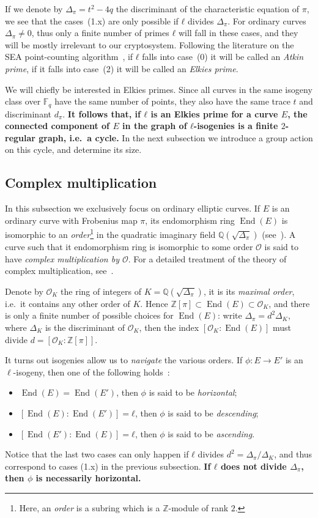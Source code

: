 \documentclass{article}
\newcommand{\F}{\mathbb{F}}
\renewcommand{\O}{\mathcal{O}}
\theoremstyle{definition}
\DeclareMathOperator{\End}{End}
\begin{document}
If we denote by $Δ_π=t^2-4q$ the discriminant of the characteristic
equation of $π$, we see that the cases~(1.x) are only possible if $ℓ$
divides $Δ_π$.  For ordinary curves $Δ_π≠0$, thus only a finite number
of primes $ℓ$ will fall in these cases, and they will be mostly
irrelevant to our cryptosystem. Following the literature on the SEA
point-counting algorithm~\cite{schoof95,todo}, if $ℓ$ falls into
case~(0) it will be called an \emph{Atkin prime}, if it falls into
case~(2) it will be called an \emph{Elkies prime}.

We will chiefly be interested in Elkies primes. Since all curves in
the same isogeny class over $\F_q$ have the same number of points,
they also have the same trace $t$ and discriminant $d_π$.
\textbf{It follows that, if $ℓ$ is an Elkies prime for a curve $E$,
  the connected component of $E$ in the graph of $ℓ$-isogenies is a
  finite $2$-regular graph, i.e.\ a cycle.} In the next subsection we
introduce a group action on this cycle, and determine its size.


\subsection{Complex multiplication}

In this subsection we exclusively focus on ordinary elliptic
curves. If $E$ is an ordinary curve with Frobenius map $π$, its
endomorphism ring $\End(E)$ is isomorphic to an
\emph{order}\footnote{Here, an \emph{order} is a subring which is a
  $ℤ$-module of rank $2$.} in the quadratic imaginary field
$ℚ(\sqrt{Δ_π})$ (see~\cite[III.9]{silverman:elliptic}).  A curve such
that it endomorphism ring is isomorphic to some order $\O$ is said to
have \emph{complex multiplication by $\O$}.  For a detailed treatment
of the theory of complex multiplication,
see~\cite{lang1987elliptic,silverman:advanced}.

Denote by $\O_K$ the ring of integers of $K=ℚ(\sqrt{Δ_π})$, it is its
\emph{maximal order}, i.e.\ it contains any other order of $K$.  Hence
$ℤ[π]⊂\End(E)⊂\O_K$, and there is only a finite number of possible
choices for $\End(E)$: write $Δ_π=d^2Δ_K$, where $Δ_K$ is the
discriminant of $\O_K$, then the index $[\O_K:\End(E)]$ must divide
$d=[\O_K:ℤ[π]]$.

It turns out isogenies allow us to \emph{navigate} the various
orders. If $ϕ:E→E'$ is an $\ell$-isogeny, then one of the following
holds~\cite[Prop.~21]{kohel}:
\begin{itemize}
\item $\End(E) = \End(E')$, then $ϕ$ is said to be
  \emph{horizontal};
\item $[\End(E):\End(E')] = ℓ$, then $ϕ$ is said to be
  \emph{descending};
\item $[\End(E'):\End(E)] = ℓ$, then $ϕ$ is said to be
  \emph{ascending}.
\end{itemize}
Notice that the last two cases can only happen if $ℓ$ divides
$d^2=Δ_π/Δ_K$, and thus correspond to cases (1.x) in the previous
subsection.
\textbf{If $ℓ$ does not divide $Δ_π$, then $ϕ$ is necessarily
  horizontal.}
\end{document}
